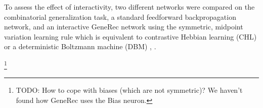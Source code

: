 

To assess the effect of interactivity, two different networks were compared on the combinatorial generalization task, a standard feedforward backpropagation network, and an interactive GeneRec network using the symmetric, midpoint variation learning rule which is equivalent to contrastive Hebbian learning (CHL) or a deterministic Boltzmann machine (DBM) \citet{o1996bio}, \citet{o2001generalization}. 
 
\footnote{TODO: How to cope with biases (which are not symmetric)? We haven't found how GeneRec uses the Bias neuron.} 
